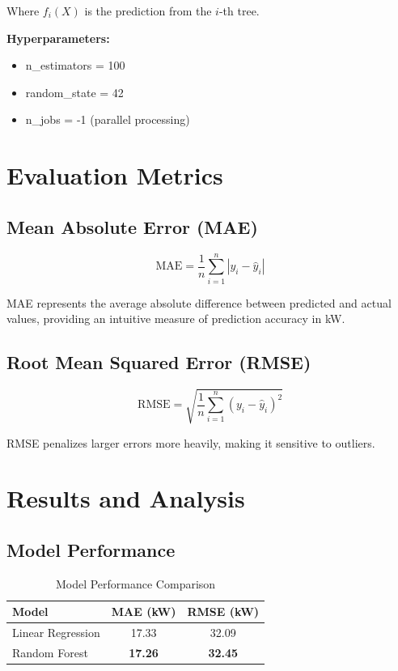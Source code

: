 \documentclass[12pt,a4paper]{article}
\begin{document}
Where $f_i(X)$ is the prediction from the $i$-th tree.

\textbf{Hyperparameters:}
\begin{itemize}
    \item n\_estimators = 100
    \item random\_state = 42
    \item n\_jobs = -1 (parallel processing)
\end{itemize}

\section{Evaluation Metrics}

\subsection{Mean Absolute Error (MAE)}
\begin{equation}
\text{MAE} = \frac{1}{n}\sum_{i=1}^{n}|y_i - \hat{y}_i|
\end{equation}

MAE represents the average absolute difference between predicted and actual values, providing an intuitive measure of prediction accuracy in kW.

\subsection{Root Mean Squared Error (RMSE)}
\begin{equation}
\text{RMSE} = \sqrt{\frac{1}{n}\sum_{i=1}^{n}(y_i - \hat{y}_i)^2}
\end{equation}

RMSE penalizes larger errors more heavily, making it sensitive to outliers.

\section{Results and Analysis}

\subsection{Model Performance}

\begin{table}[h]
\centering
\begin{tabular}{@{}lcc@{}}
\toprule
\textbf{Model} & \textbf{MAE (kW)} & \textbf{RMSE (kW)} \\ \midrule
Linear Regression & 17.33 & 32.09 \\
Random Forest & \textbf{17.26} & \textbf{32.45} \\ \bottomrule
\end{tabular}
\caption{Model Performance Comparison}
\label{tab:results}
\end{table}
\end{document}

